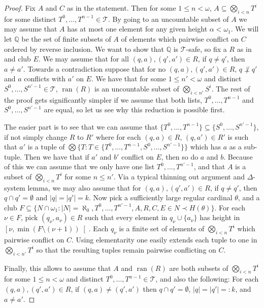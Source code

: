 \documentclass[10pt,a4paper]{amsart}
\theoremstyle{definition}
\newcommand{\Q}{\mathbb{Q}}
\newcommand{\seb}{\subseteq}
\newcommand{\setm}{\setminus}
\newcommand{\es}{\emptyset}
\newcommand{\1}{\mathbf{1}}
\newcommand{\T}{\mathcal{T}}
\DeclareMathOperator{\ran}{ran}
\begin{document}
\begin{proof}
  Fix $A$ and $C$ as in the statement. Then for some
  $1 \le n < \omega$, $A \seb \bigotimes_{i < n}T^{i}$ for some
  distinct $T^{0},\dots,T^{n-1} \in \T$.  By going to an uncountable
  subset of $A$ we may assume that $A$ has at most one element for any
  given height $\alpha < \omega_{1}$. We will let
  $\mathbb{Q}$ be the set of finite subsets of $A$ of elements which pairwise
  conflict on $C$ ordered by reverse inclusion.
  We want to show that $\Q$ is $\T$-safe,
  so fix a $R$ as in  and club $E$. We may assume that
  for all $(q,a),(q',a') \in R$, if $q \neq q'$, then $a \neq a'$.
  Towards
  a contradiction suppose that for no $(q,a),(q',a') \in R$,
  $q \not\perp q'$ and $a$ conflicts with $a'$ on $E$.
  We have that
  for some $1 \le n' < \omega$ and
  distinct $S^{0},\dots,S^{n'-1} \in \T$,
  $\ran(R)$ is an uncountable subset of $\bigotimes_{i < n'}S^{i}$. The rest
  of the proof gets significantly simpler if we assume that both lists,
  $T^{0},\dots,T^{n-1}$ and $S^{0},\dots,S^{n'-1}$ are equal, so let us
  see why this reduction is possible first.

  The easier part is to see that we can assume that
  $\{T^{0},\dots,T^{n-1}\} \seb \{S^{0},\dots,S^{n'-1}\}$, if not
  simply change $R$ to $R'$ where for each $(q,a) \in R$, $(q,a') \in R'$
  is such that $a'$ is a tuple of
  $\bigotimes\{T : T \in \{T^{0},\dots,T^{n-1},S^{0},\dots,S^{n'-1}\}\}$ which
  has $a$ as a sub-tuple. Then we have that if $a'$ and $b'$ conflict on $E$,
  then so do $a$ and $b$. Because of this we can assume that we only
  have one list $T^{0},\dots,T^{n'-1}$, and that $A$ is a subset
  of $\bigotimes_{i < n}T^{i}$ for some $n \le n'$. Via a typical thinning out
  argument and $\Delta$-system lemma, we may also assume that
  for $(q,a),(q',a') \in R$, if $q \neq q'$, then $q \cap q' = \es$
  and $|q| = |q'| = k$. Now
  pick a sufficiently large regular cardinal $\theta$, and a club
  $F \seb \{N \cap \omega_{1} : |N| = \aleph_{0}, T^{0},\dots,T^{n'-1},
  A,R,C,E \in N \prec H(\theta)\}$. For each $\nu \in F$,
  pick $(q_{\nu},a_{\nu}) \in R$
  such that every element in $q_{\nu} \cup \{a_{\nu}\}$ has height
  in $\left[\nu,\min(F\setm(\nu + 1))\right[$. Each $q_{\nu}$ is a finite set of
  elements of $\bigotimes_{i<n}T^{i}$ which pairwise conflict on $C$.
  Using elementarity one easily extends each tuple to one
  in $\bigotimes_{i < n'}T^{i}$ so that the resulting tuples remain
  pairwise conflicting on $C$.

  Finally, this allows to assume that $A$ and $\ran(R)$ are both
  subsets of $\bigotimes_{i < n}T^{i}$ for some $1 \le n < \omega$ and
  distinct $T^{0},\dots,T^{n-1} \in \T$, and also the following:
  For each $(q,a),(q',a') \in R$, if $(q,a) \neq (q',a')$ then
  $q \cap q' = \es$, $|q| = |q'| =: k$, and $a \neq a'$.


\end{proof}
\end{document}
